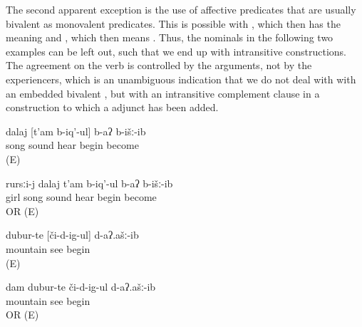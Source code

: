 The second apparent exception is the use of affective predicates that are usually bivalent as monovalent predicates. This is possible with , which then has the meaning  and , which then means . Thus, the  nominals in the following two examples can be left out, such that we end up with intransitive constructions. The agreement on the verb  is controlled by the  arguments, not by the  experiencers, which is an unambiguous indication that we do not deal with  with an embedded bivalent , but with an intransitive complement clause in a construction to which a  adjunct has been added.
%
\begin{exe}
	\ex	\label{ex:‎The song began to be audible}
	\gll	dalaj	[t'am	b-iq'-ul]	b-aʔ	b-išː-ib\\
		song	sound	hear	\tsc{n-}begin	become\\
	\glt	{} (E)

	\ex	\label{ex:‎The girl began to hear the song}
	\gll	rursːi-j	dalaj	t'am	b-iq'-ul	b-aʔ	b-išː-ib\\
		girl	song	sound	hear	\tsc{n-}begin	become\\
	\glt	{} OR  (E)

	\ex	\label{ex:‎The mountains started to be visible}
	\gll	dubur-te	[či-d-ig-ul]	d-aʔ.ašː-ib\\
		mountain	see	begin\\
	\glt	{} (E)

	\ex	\label{ex:‎I began to see the mountains}
	\gll	dam	dubur-te	či-d-ig-ul	d-aʔ.ašː-ib\\
			mountain	see	begin\\
	\glt	{} OR  (E)
\end{exe}


